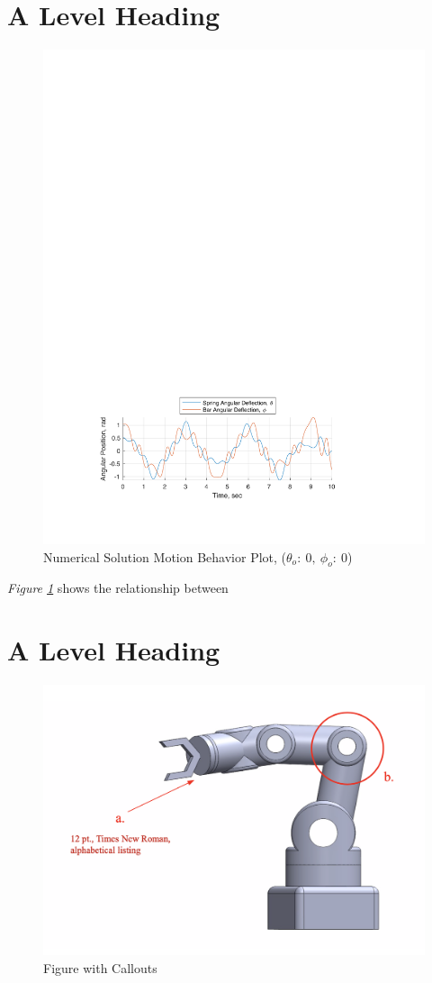 \documentclass[12pt]{report}
\begin{document}
\section{A Level Heading}
\blindtext
\newpage
\begin{figure}[h]
  \includegraphics[center]{spring_0-0}
  \caption{Numerical Solution Motion Behavior Plot, ($\theta_o:~0,~\phi_o:~0$)}
  \label{fig:spring}
\end{figure}

\emph{Figure \ref{fig:spring}} shows the relationship between \blindtext
\newpage
\section{A Level Heading}
\begin{figure}[h]
  \centering
  \includegraphics[width=.75\textwidth]{callouts}
  \caption{Figure with Callouts}
  \label{fig:callouts}
\end{figure}
\end{document}
